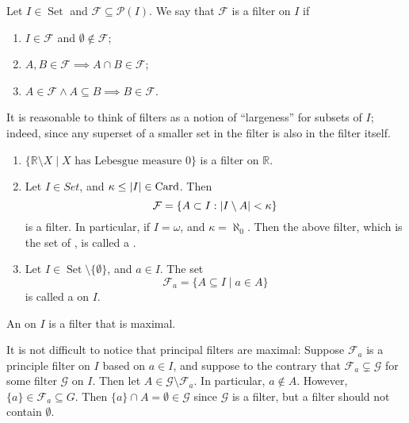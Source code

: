 \documentclass[notoc,notitlepage]{tufte-book}
\DeclareMathOperator{\Card}{Card }
\DeclareMathOperator{\Set}{Set }
\begin{document}
\begin{defn}[Filter]\label{defn:filter}
  Let $I \in \Set$ and $\mathcal{F} \subseteq \mathcal{P}(I)$. We say that $\mathcal{F}$ is a filter on $I$ if
  \begin{enumerate}
    \item $I \in \mathcal{F}$ and $\emptyset \notin \mathcal{F}$;
    \item $A, B \in \mathcal{F} \implies A \cap B \in \mathcal{F}$;
    \item $A \in \mathcal{F} \land A \subseteq B \implies B \in \mathcal{F}$.
  \end{enumerate}
\end{defn}

\begin{remark}
  It is reasonable to think of filters as a notion of ``largeness'' for subsets of $I$; indeed, since any superset of a smaller set in the filter is also in the filter itself.
\end{remark}

\begin{eg}
  \begin{enumerate}
    \item $\{ \mathbb{R} \setminus X \mid X \text{ has Lebesgue measure } 0 \}$ is a filter on $\mathbb{R}$.
    \item Let $I \in Set$, and $\kappa \leq \abs{I} \in \Card$. Then
      \begin{equation*}
        \mathcal{F} = \{ A \subset I : \left| I \setminus A \right| < \kappa \}
      \end{equation*}
      is a filter. In particular, if $I = \omega$, and $\kappa = \aleph_0$. Then the above filter, which is the set of , is called a .
    \item Let $I \in \Set \setminus \{\emptyset\}$, and $a \in I$. The set
      \begin{equation*}
        \mathcal{F}_a = \{ A \subseteq I \mid a \in A \}
      \end{equation*}
      is called a  on $I$.
  \end{enumerate}
\end{eg}

\begin{defn}[Ultrafilter]\label{defn:ultrafilter}
  An  on $I$ is a filter that is maximal.
\end{defn}

\begin{eg}
  It is not difficult to notice that principal filters are maximal: Suppose $\mathcal{F}_a$ is a principle filter on $I$ based on $a \in I$, and suppose to the contrary that $\mathcal{F}_a \subsetneq \mathcal{G}$ for some filter $\mathcal{G}$ on $I$. Then let $A \in \mathcal{G} \setminus \mathcal{F}_a$. In particular, $a \notin A$. However, $\{ a \} \in \mathcal{F}_a \subseteq G$. Then $\{ a \} \cap A = \emptyset \in \mathcal{G}$ since $\mathcal{G}$ is a filter, but a filter should not contain $\emptyset$.
\end{eg}
\end{document}
